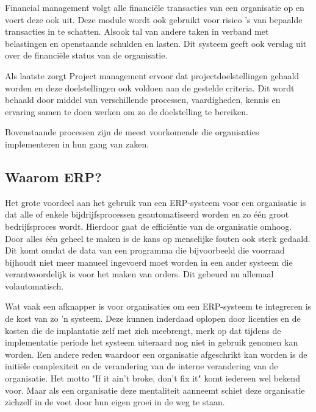 \documentclass{hogent-article}
\begin{document}
Financial management volgt alle financiële transacties van een organisatie op en voert deze ook uit. Deze module wordt ook gebruikt voor risico 's van bepaalde transacties in te schatten. Alsook tal van andere taken in verband met belastingen en openstaande schulden en lasten. Dit systeem geeft ook verslag uit over de financiële status van de organisatie. \autocite{Ding2015} \par

Als laatste zorgt Project management ervoor dat projectdoelstellingen gehaald worden en deze doelstellingen ook voldoen aan de gestelde criteria. Dit wordt behaald door middel van verschillende processen, vaardigheden, kennis en ervaring samen te doen werken om zo de doelstelling te bereiken. \autocite{Schwalbe2015} \par

Bovenstaande processen zijn de meest voorkomende die organisaties implementeren in hun gang van zaken.

\subsection{Waarom ERP?}

Het grote voordeel aan het gebruik van een ERP-systeem voor een organisatie is dat alle of enkele bijdrijfsprocessen geautomatiseerd worden en zo één groot bedrijfsproces wordt. Hierdoor gaat de efficiëntie van de organisatie omhoog. Door alles één geheel te maken is de kans op menselijke fouten ook sterk gedaald. Dit komt omdat de data van een programma die bijvoorbeeld die voorraad bijhoudt niet meer manueel ingevoerd moet worden in een ander systeem die verantwoordelijk is voor het maken van orders. Dit gebeurd nu allemaal volautomatisch. \autocite{Schwarz2020} \par

Wat vaak een afknapper is voor organisaties om een ERP-systeem te integreren is de kost van zo 'n systeem. Deze kunnen inderdaad oplopen door licenties en de kosten die de implantatie zelf met zich meebrengt, merk op dat tijdens de implementatie periode het systeem uiteraard nog niet in gebruik genomen kan worden. Een andere reden waardoor een organisatie afgeschrikt kan worden is de initiële complexiteit en de verandering van de interne verandering van de organisatie. Het motto "If it ain't broke, don't fix it" komt iedereen wel bekend voor. Maar als een organisatie deze mentaliteit aanneemt schiet deze organisatie zichzelf in de voet door hun eigen groei in de weg te staan. \autocite{Schwarz2020}\par
\end{document}
